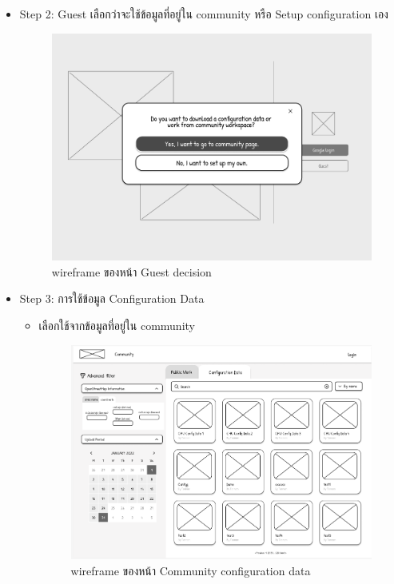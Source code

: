 \begin{mypara}
\begin{itemize}
    \item Step 2: Guest เลือกว่าจะใช้ข้อมูลที่อยู่ใน community หรือ Setup configuration เอง
      \begin{figure}[H]
        \centering
        \includegraphics[scale=0.4]
        {guest_login.png}
        \caption{wireframe ของหน้า Guest decision}
        \label{fig:WireframeGuestDecision}
      \end{figure}

    \item Step 3: การใช้ข้อมูล Configuration Data
    \begin{itemize}
        \item เลือกใช้จากข้อมูลที่อยู่ใน community
          \begin{figure}[H]
            \centering
            \includegraphics[scale=0.4]{conf_commu_guest.png}
            \caption{wireframe ของหน้า Community configuration data}
            \label{fig:WireframeCommunityConfigGuest}
          \end{figure}


\end{itemize}
\end{itemize}
\end{mypara}
